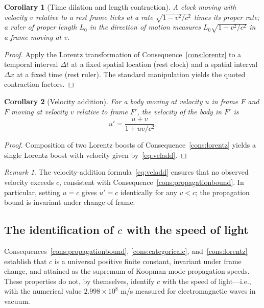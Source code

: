 \documentclass[11pt,twocolumn,a4paper]{article}
\theoremstyle{axiomstyle}
\theoremstyle{conseqstyle}
\newtheorem{corollary}{Corollary}
\theoremstyle{definition}
\theoremstyle{remark}
\newtheorem*{remark}{Remark}
\begin{document}
\begin{corollary}[Time dilation and length contraction]
\label{cor:timedil}
A clock moving with velocity $v$ relative to a rest frame ticks at a rate $\sqrt{1-v^{2}/c^{2}}$ times its proper rate; a ruler of proper length $L_{0}$ in the direction of motion measures $L_{0}\sqrt{1-v^{2}/c^{2}}$ in a frame moving at $v$.
\end{corollary}

\begin{proof}
Apply the Lorentz transformation of Consequence~\ref{cons:lorentz} to a temporal interval $\Delta t$ at a fixed spatial location (rest clock) and a spatial interval $\Delta x$ at a fixed time (rest ruler). The standard manipulation \citep{landaulifshitz1} yields the quoted contraction factors.
\end{proof}

\begin{corollary}[Velocity addition]
\label{cor:veladd}
For a body moving at velocity $u$ in frame $F$ and $F$ moving at velocity $v$ relative to frame $F'$, the velocity of the body in $F'$ is
\begin{equation}
u'=\frac{u+v}{1+uv/c^{2}}.
\label{eq:veladd}
\end{equation}
\end{corollary}

\begin{proof}
Composition of two Lorentz boosts of Consequence~\ref{cons:lorentz} yields a single Lorentz boost with velocity given by~\eqref{eq:veladd}.
\end{proof}

\begin{remark}
The velocity-addition formula~\eqref{eq:veladd} ensures that no observed velocity exceeds $c$, consistent with Consequence~\ref{cons:propagationbound}. In particular, setting $u=c$ gives $u'=c$ identically for any $v<c$; the propagation bound is invariant under change of frame.
\end{remark}

\subsection{The identification of $c$ with the speed of light}

Consequences~\ref{cons:propagationbound}, \ref{cons:categoricalc}, and~\ref{cons:lorentz} establish that $c$ is a universal positive finite constant, invariant under frame change, and attained as the supremum of Koopman-mode propagation speeds. These properties do not, by themselves, identify $c$ with the speed of light---i.e., with the numerical value $2.998\times 10^{8}$ m/s measured for electromagnetic waves in vacuum.
\end{document}
